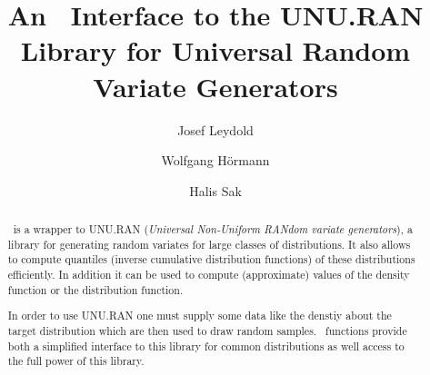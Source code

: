 
\subject{{\Huge\Runuran}}

\title{%
  An \R\ Interface to the UNU.RAN Library
  for Universal Random Variate Generators}

\author{Josef Leydold \and Wolfgang H\"ormann \and Halis Sak}

\publishers{%
  Department of Statistics and Mathematics, WU Wien, Austria\\
  Department for Industrial Engineering,
  Bo\u{g}azi\c{c}i University, Istanbul, Turkey
}


\maketitle


\begin{abstract}
  \noindent
  \Runuran\ is a wrapper to UNU.RAN (\emph{Universal
    Non-Uniform RANdom variate generators}), a library for generating
  random variates for large classes of distributions. It also allows
  to compute quantiles (inverse cumulative distribution 
  functions) of these distributions efficiently. 
  In addition it can be used to compute (approximate) values of the
  density function or the distribution function.

  In order to use UNU.RAN one must supply some data like the denstiy 
  about the target distribution which are then used to draw random samples.
  \Runuran\ functions provide both a simplified interface to this
  library for common distributions as well access to the full power of
  this library.
\end{abstract}

